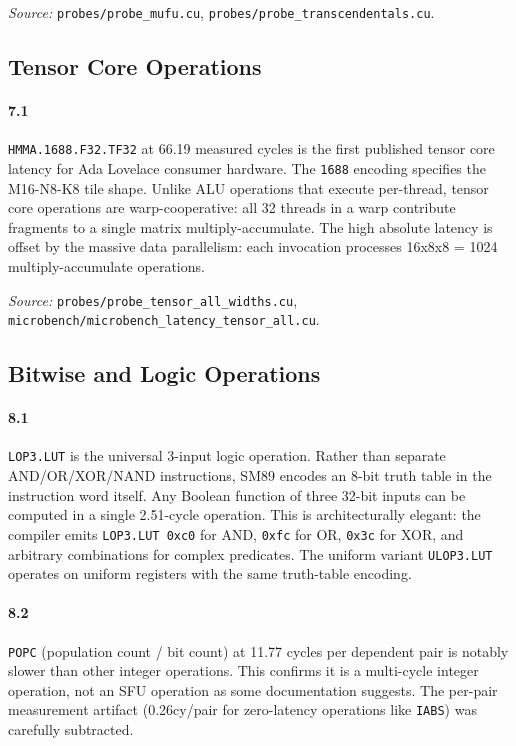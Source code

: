 \textit{Source:} \texttt{probes/probe\_mufu.cu},
\texttt{probes/probe\_transcendentals.cu}.

\subsection{Tensor Core Operations}
\label{par:tensor}

\paragraph{7.1}
\texttt{HMMA.1688.F32.TF32} at 66.19 measured cycles is the first published
tensor core latency for Ada Lovelace consumer hardware.  The \texttt{1688}
encoding specifies the M16-N8-K8 tile shape.  Unlike ALU operations that
execute per-thread, tensor core operations are warp-cooperative: all 32
threads in a warp contribute fragments to a single matrix multiply-accumulate.
The high absolute latency is offset by the massive data parallelism: each
invocation processes 16x8x8 = 1024 multiply-accumulate operations.

\textit{Source:} \texttt{probes/probe\_tensor\_all\_widths.cu},
\texttt{microbench/microbench\_latency\_tensor\_all.cu}.

\subsection{Bitwise and Logic Operations}
\label{par:bitwise}

\paragraph{8.1}
\texttt{LOP3.LUT} is the universal 3-input logic operation.  Rather than
separate AND/OR/XOR/NAND instructions, SM89 encodes an 8-bit truth table
in the instruction word itself.  Any Boolean function of three 32-bit inputs
can be computed in a single 2.51-cycle operation.  This is architecturally
elegant: the compiler emits \texttt{LOP3.LUT 0xc0} for AND, \texttt{0xfc}
for OR, \texttt{0x3c} for XOR, and arbitrary combinations for complex
predicates.  The uniform variant \texttt{ULOP3.LUT} operates on uniform
registers with the same truth-table encoding.

\paragraph{8.2}
\texttt{POPC} (population count / bit count) at 11.77 cycles per dependent
pair is notably slower than other integer operations.  This confirms it is
a multi-cycle integer operation, not an SFU operation as some documentation
suggests.  The per-pair measurement artifact (0.26cy/pair for zero-latency
operations like \texttt{IABS}) was carefully subtracted.

